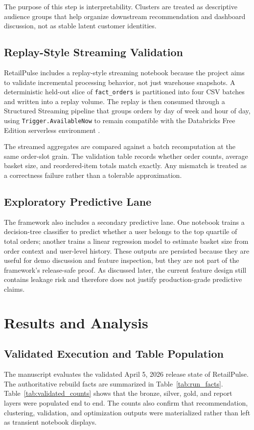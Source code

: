 \documentclass[journal]{IEEEtran}
\begin{document}
The purpose of this step is interpretability. Clusters are treated as descriptive audience groups that help organize downstream recommendation and dashboard discussion, not as stable latent customer identities.

\subsection{Replay-Style Streaming Validation}
RetailPulse includes a replay-style streaming notebook because the project aims to validate incremental processing behavior, not just warehouse snapshots. A deterministic held-out slice of \texttt{fact\_orders} is partitioned into four CSV batches and written into a replay volume. The replay is then consumed through a Structured Streaming pipeline that groups orders by day of week and hour of day, using \texttt{Trigger.AvailableNow} to remain compatible with the Databricks Free Edition serverless environment \cite{armbrust2018structured,databricks_free}.

The streamed aggregates are compared against a batch recomputation at the same order-slot grain. The validation table records whether order counts, average basket size, and reordered-item totals match exactly. Any mismatch is treated as a correctness failure rather than a tolerable approximation.

\subsection{Exploratory Predictive Lane}
The framework also includes a secondary predictive lane. One notebook trains a decision-tree classifier to predict whether a user belongs to the top quartile of total orders; another trains a linear regression model to estimate basket size from order context and user-level history. These outputs are persisted because they are useful for demo discussion and feature inspection, but they are not part of the framework's release-safe proof. As discussed later, the current feature design still contains leakage risk and therefore does not justify production-grade predictive claims.

\section{Results and Analysis}
\subsection{Validated Execution and Table Population}
The manuscript evaluates the validated April 5, 2026 release state of RetailPulse. The authoritative rebuild facts are summarized in Table~\ref{tab:run_facts}. Table~\ref{tab:validated_counts} shows that the bronze, silver, gold, and report layers were populated end to end. The counts also confirm that recommendation, clustering, validation, and optimization outputs were materialized rather than left as transient notebook displays.
\end{document}
